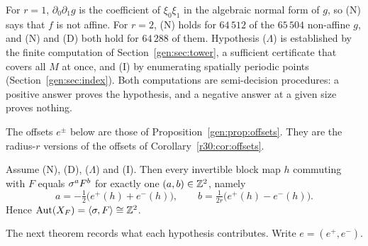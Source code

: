 For $r=1$, $\partial_0\partial_1g$ is the coefficient of $\xi_0\xi_1$ in the algebraic normal form of $g$, so (N) says that $f$ is not affine. For $r=2$, \textup{(N)} holds for $64\,512$ of the $65\,504$ non-affine $g$, and \textup{(N)} and \textup{(D)} both hold for $64\,288$ of them. Hypothesis ($\Lambda$) is established by the finite computation of Section~\ref{gen:sec:tower}, a sufficient certificate that covers all $M$ at once, and (I) by enumerating spatially periodic points (Section~\ref{gen:sec:index}). Both computations are semi-decision procedures: a positive answer proves the hypothesis, and a negative answer at a given size proves nothing.

The offsets $e^\pm$ below are those of Proposition~\ref{gen:prop:offsets}. They are the radius-$r$ versions of the offsets of Corollary~\ref{r30:cor:offsets}.

\begin{theorem}\label{gen:main}
Assume \textup{(N)}, \textup{(D)}, \textup{($\Lambda$)} and \textup{(I)}. Then every invertible block map $h$ commuting with $F$ equals $\sigma^aF^b$ for exactly one $(a,b)\in\mathbb{Z}^2$, namely
\[
a=-\tfrac12\bigl(e^+(h)+e^-(h)\bigr),\qquad b=\tfrac1{2r}\bigl(e^+(h)-e^-(h)\bigr).
\]
Hence $\operatorname{Aut}(X_F)=\langle\sigma,F\rangle\cong\mathbb{Z}^2$.
\end{theorem}

The next theorem records what each hypothesis contributes. Write $e=(e^+,e^-)$.

